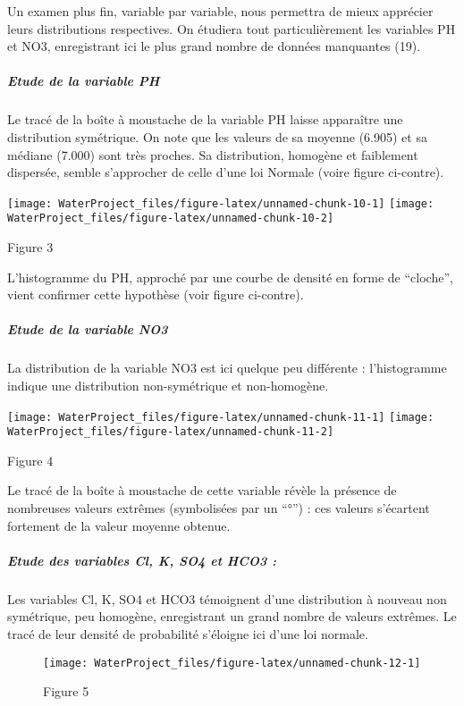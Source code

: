 \documentclass[]{article}
\let\oldsubparagraph\subparagraph
\renewcommand{\subparagraph}[1]{\oldsubparagraph{#1}\mbox{}}
\begin{document}
Un examen plus fin, variable par variable, nous permettra de mieux
apprécier leurs distributions respectives. On étudiera tout
particulièrement les variables PH et NO3, enregistrant ici le plus grand
nombre de données manquantes (19).

\subparagraph{\texorpdfstring{Etude de la variable
PH}{ Etude de la variable PH}}\label{etude-de-la-variable-ph}

Le tracé de la boîte à moustache de la variable PH laisse apparaître une
distribution symétrique. On note que les valeurs de sa moyenne (6.905)
et sa médiane (7.000) sont très proches. Sa distribution, homogène et
faiblement dispersée, semble s'approcher de celle d'une loi Normale
(voire figure ci-contre).

\texttt{[image: WaterProject\_files/figure-latex/unnamed-chunk-10-1]}
\texttt{[image: WaterProject\_files/figure-latex/unnamed-chunk-10-2]}

Figure 3

L'histogramme du PH, approché par une courbe de densité en forme de
``cloche'', vient confirmer cette hypothèse (voir figure ci-contre).

\subparagraph{\texorpdfstring{Etude de la variable
NO3}{ Etude de la variable NO3}}\label{etude-de-la-variable-no3}

La distribution de la variable NO3 est ici quelque peu différente :
l'histogramme indique une distribution non-symétrique et non-homogène.

\texttt{[image: WaterProject\_files/figure-latex/unnamed-chunk-11-1]}
\texttt{[image: WaterProject\_files/figure-latex/unnamed-chunk-11-2]}

Figure 4

Le tracé de la boîte à moustache de cette variable révèle la présence de
nombreuses valeurs extrêmes (symbolisées par un ``°'') : ces valeurs
s'écartent fortement de la valeur moyenne obtenue.

\subparagraph{\texorpdfstring{Etude des variables Cl, K, SO4 et HCO3
:}{ Etude des variables Cl, K, SO4 et HCO3 :}}\label{etude-des-variables-cl-k-so4-et-hco3}

Les variables Cl, K, SO4 et HCO3 témoignent d'une distribution à nouveau
non symétrique, peu homogène, enregistrant un grand nombre de valeurs
extrêmes. Le tracé de leur densité de probabilité s'éloigne ici d'une
loi normale.

\begin{figure}

{\centering \texttt{[image: WaterProject\_files/figure-latex/unnamed-chunk-12-1]} 

}

\caption{Figure 5}\label{fig:unnamed-chunk-12}
\end{figure}
\end{document}
